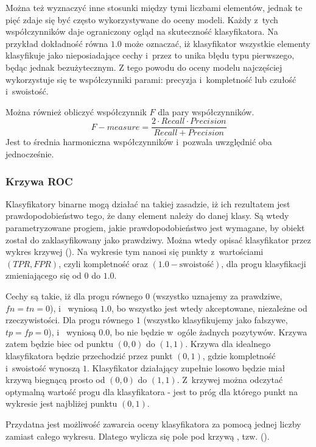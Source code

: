 Można też wyznaczyć inne stosunki między tymi liczbami elementów,
jednak te pięć zdaje się być często wykorzystywane do oceny modeli.
Każdy z~tych współczynników daje ograniczony ogląd na skuteczność
klasyfikatora. Na przykład dokładność równa $1.0$ może oznaczać,
iż klasyfikator wszystkie elementy klasyfikuje jako nieposiadające
cechy i~przez to unika błędu typu pierwszego, będąc jednak bezużytecznym.
Z tego powodu do oceny modelu najczęściej wykorzystuje się te
współczynniki parami: precyzja i~kompletność lub czułość i~swoistość.

Można również obliczyć współczynnik $F$ dla pary współczynników.
$$\mathit{F{-}measure} = \frac{2 \cdot Recall \cdot Precision}{Recall + Precision}$$
Jest to średnia harmoniczna współczynników i~pozwala uwzględnić oba jednocześnie.

\subsubsection{Krzywa ROC}

Klasyfikatory binarne mogą działać na takiej zasadzie, iż ich rezultatem jest prawdopodobieństwo
tego, że dany element należy do danej klasy. Są wtedy parametryzowane progiem,
jakie prawdopodobieństwo jest wymagane, by obiekt został do zaklasyfikowany jako prawdziwy.
Można wtedy opisać klasyfikator przez wykres krzywej 
(). Na wykresie tym nanosi się punkty z~wartościami
$(\mathit{TPR}, \mathit{FPR})$, czyli kompletność oraz $(1.0 - \text{swoistość})$, dla progu klasyfikacji
zmieniającego się od $0$ do $1.0$.

Cechy  są takie, iż dla progu równego $0$ (wszystko uznajemy za prawdziwe, $fn = tn = 0$),
 i~
wyniosą $1.0$, bo wszystko jest wtedy akceptowane, niezależne od rzeczywistości.
Dla progu równego $1$ (wszystko klasyfikujemy jako fałszywe, $tp = fp = 0$),
 i~ wyniosą $0.0$, bo nie będzie w~ogóle żadnych pozytywów.
Krzywa zatem będzie biec od punktu $(0, 0)$ do $(1, 1)$. Krzywa dla idealnego klasyfikatora
będzie przechodzić przez punkt $(0, 1)$, gdzie kompletność i~swoistość wynoszą $1$. Klasyfikator
działający zupełnie losowo będzie miał krzywą biegnącą prosto od $(0, 0)$ do $(1, 1)$. Z~krzywej
 można odczytać optymalną wartość progu dla klasyfikatora - jest to próg dla którego punkt
na wykresie jest najbliżej punktu $(0, 1)$.

Przydatna jest możliwość zawarcia oceny klasyfikatora za pomocą jednej liczby zamiast całego wykresu.
Dlatego wylicza się pole pod krzywą , tzw.  ().

